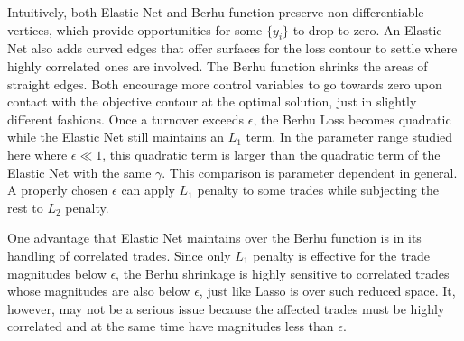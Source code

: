 \documentclass[11pt, letterpaper]{article}
\begin{document}
Intuitively, both Elastic Net and Berhu function preserve non-differentiable vertices, which provide opportunities for some
$\{y_i\}$ to drop to zero. An Elastic Net also adds curved edges that offer surfaces for the loss contour to settle where highly
correlated ones are involved. The Berhu function shrinks the areas of straight edges. Both encourage more control variables to
go towards zero upon contact with the objective contour at the optimal solution, just in slightly different fashions. Once a
turnover exceeds $\epsilon$, the Berhu Loss becomes quadratic while the Elastic Net still maintains an $L_1$ term. In the
parameter range studied here where $\epsilon \ll 1$, this quadratic term is larger than the quadratic term of the Elastic Net
with the same $\gamma$. This comparison is parameter dependent in general. A properly chosen $\epsilon$ can apply $L_1$ penalty
to some trades while subjecting the rest to $L_2$ penalty.

One advantage that Elastic Net maintains over the Berhu function is in its handling of correlated trades. Since only $L_1$
penalty is effective for the trade magnitudes below $\epsilon$, the Berhu shrinkage is highly sensitive to correlated trades
whose magnitudes are also below $\epsilon$, just like Lasso is over such reduced space. It, however, may not be a serious issue
because the affected trades must be highly correlated and at the same time have magnitudes less than $\epsilon$.
\end{document}
